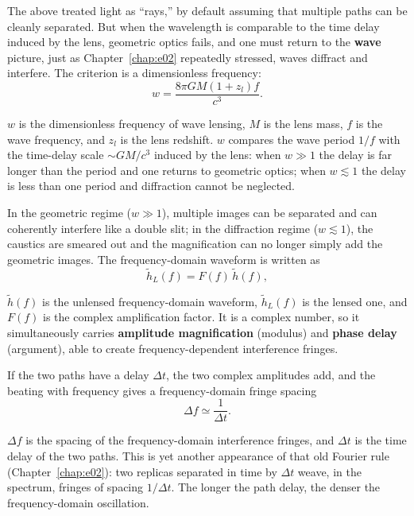 The above treated light as ``rays,'' by default assuming that multiple paths can be cleanly separated. But when the wavelength is comparable to the time delay induced by the lens, geometric optics fails, and one must return to the \textbf{wave} picture, just as Chapter~\ref{chap:e02} repeatedly stressed, waves diffract and interfere. The criterion is a dimensionless frequency:
\begin{equation}
  w
  =
  \frac{8\pi GM(1+z_l)f}{c^3}.
  \label{eq:e21-wave-lensing-w}
\end{equation}
\begin{formulaexplain}
\(w\) is the dimensionless frequency of wave lensing, \(M\) is the lens mass, \(f\) is the wave frequency, and \(z_l\) is the lens redshift. \(w\) compares the wave period \(1/f\) with the time-delay scale \(\sim GM/c^3\) induced by the lens: when \(w\gg1\) the delay is far longer than the period and one returns to geometric optics; when \(w\lesssim1\) the delay is less than one period and diffraction cannot be neglected.
\end{formulaexplain}
In the geometric regime (\(w\gg1\)), multiple images can be separated and can coherently interfere like a double slit; in the diffraction regime (\(w\lesssim1\)), the caustics are smeared out and the magnification can no longer simply add the geometric images. The frequency-domain waveform is written as
\begin{equation}
  \tilde h_L(f)=F(f)\,\tilde h(f),
  \label{eq:e21-wave-amplification}
\end{equation}
\begin{formulaexplain}
\(\tilde h(f)\) is the unlensed frequency-domain waveform, \(\tilde h_L(f)\) is the lensed one, and \(F(f)\) is the complex amplification factor. It is a complex number, so it simultaneously carries \textbf{amplitude magnification} (modulus) and \textbf{phase delay} (argument), able to create frequency-dependent interference fringes.
\end{formulaexplain}
If the two paths have a delay \(\Delta t\), the two complex amplitudes add, and the beating with frequency gives a frequency-domain fringe spacing
\begin{equation}
  \Delta f \simeq \frac{1}{\Delta t}.
  \label{eq:e21-lensing-fringe-spacing}
\end{equation}
\begin{formulaexplain}
\(\Delta f\) is the spacing of the frequency-domain interference fringes, and \(\Delta t\) is the time delay of the two paths. This is yet another appearance of that old Fourier rule (Chapter~\ref{chap:e02}): two replicas separated in time by \(\Delta t\) weave, in the spectrum, fringes of spacing \(1/\Delta t\). The longer the path delay, the denser the frequency-domain oscillation.
\end{formulaexplain}
